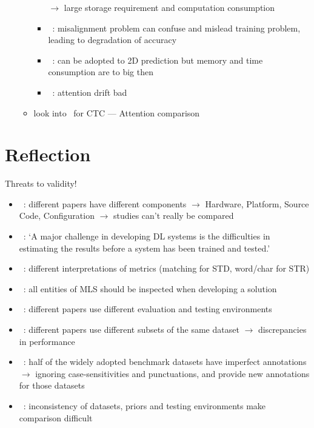 \begin{itemize}
\begin{itemize}
\begin{itemize}
                        $\rightarrow$ large storage requirement and computation consumption
                    \item~\cite{xie_aggregation_2019}: misalignment problem can confuse and mislead
                        training problem, leading to degradation of accuracy
                    \item~\cite{xie_aggregation_2019}: can be adopted to 2D prediction but
                        memory and time consumption are to big then
                    \item~\cite{cheng_focusing_2017}: attention drift bad
                \end{itemize}
            \item look into~\cite{cong_comparative_2019} for CTC --- Attention comparison
        \end{itemize}
\end{itemize}

\section{Reflection}
Threats to validity!
\begin{itemize}
    \item~\cite{arpteg_software_2018}: different papers have different components
        $\rightarrow$ Hardware, Platform, Source Code, Configuration
        $\rightarrow$ studies can't really be compared
    \item~\cite{arpteg_software_2018}: `A major challenge in developing DL systems is the
        difficulties in estimating the results before a system has been trained and tested.'
    \item~\cite{long_scene_2021}: different interpretations of metrics (matching for \ac{STD},
        word/char for \ac{STR})
    \item~\cite{siebert_construction_2021,nakamichi_requirements-driven_2020}: all entities of
        \ac{MLS} should be inspected when developing a solution
    \item~\cite{baek_what_2019}: different papers use different evaluation and testing environments
    \item~\cite{baek_what_2019}: different papers use different subsets of the same dataset
        $\rightarrow$ discrepancies in performance
    \item~\cite{long_unrealtext_2020}: half of the widely adopted benchmark datasets have imperfect
        annotations $\rightarrow$ ignoring case-sensitivities and punctuations, and provide new
        annotations for those datasets
    \item~\cite{chen_text_2021}: inconsistency of datasets, priors and testing environments make
        comparison difficult
\end{itemize}

